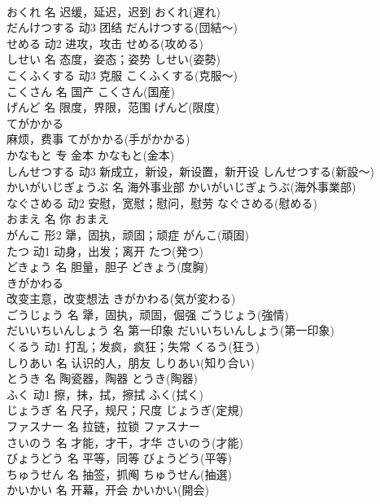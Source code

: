 \documentclass[8pt]{extreport}
\begin{document}
\begin{CJK}{UTF8}{min}
\\	おくれ	名	迟缓，延迟，迟到	おくれ(遅れ)	
\\	だんけつする	动3	团结	だんけつする(団結～)	
\\	せめる	动2	进攻，攻击	せめる(攻める)	
\\	しせい	名	态度，姿态；姿势	しせい(姿勢)	
\\	こくふくする	动3	克服	こくふくする(克服～)	
\\	こくさん	名	国产	こくさん(国産)	
\\	げんど	名	限度，界限，范围	げんど(限度)	
\\	てがかかる	
\\	麻烦，费事	てがかかる(手がかかる)	
\\	かなもと	专	金本	かなもと(金本)	
\\	しんせつする	动3	新成立，新设，新设置，新开设	しんせつする(新設～)	
\\	かいがいじぎょうぶ	名	海外事业部	かいがいじぎょうぶ(海外事業部)	
\\	なぐさめる	动2	安慰，宽慰；慰问，慰劳	なぐさめる(慰める)	
\\	おまえ	名	你	おまえ	
\\	がんこ	形2	犟，固执，顽固；顽症	がんこ(頑固)	
\\	たつ	动1	动身，出发；离开	たつ(発つ)	
\\	どきょう	名	胆量，胆子	どきょう(度胸)	
\\	きがかわる	
\\	改变主意，改变想法	きがかわる(気が変わる)	
\\	ごうじょう	名	犟，固执，顽固，倔强	ごうじょう(強情)	
\\	だいいちいんしょう	名	第一印象	だいいちいんしょう(第一印象)	
\\	くるう	动1	打乱；发疯，疯狂；失常	くるう(狂う)	
\\	しりあい	名	认识的人，朋友	しりあい(知り合い)	
\\	とうき	名	陶瓷器，陶器	とうき(陶器)	
\\	ふく	动1	擦，抹，拭，擦拭	ふく(拭く)	
\\	じょうぎ	名	尺子，规尺；尺度	じょうぎ(定規)	
\\	ファスナー	名	拉链，拉锁	ファスナー	
\\	さいのう	名	才能，才干，才华	さいのう(才能)	
\\	びょうどう	名	平等，同等	びょうどう(平等)	
\\	ちゅうせん	名	抽签，抓阄	ちゅうせん(抽選)	
\\	かいかい	名	开幕，开会	かいかい(開会)	

\end{CJK}
\end{document}
